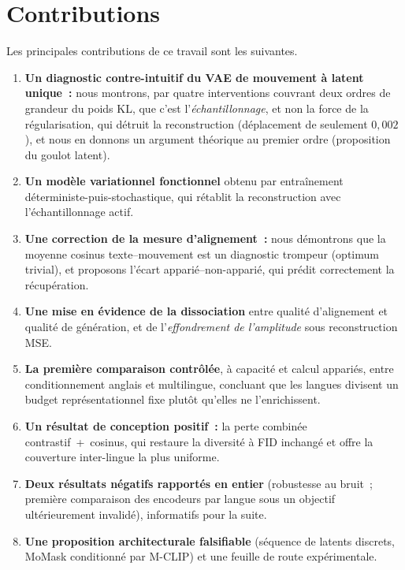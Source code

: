 \documentclass[12pt,a4paper,oneside]{report}
\theoremstyle{definition}
\theoremstyle{plain}
\begin{document}
\section*{Contributions}

Les principales contributions de ce travail sont les suivantes.

\begin{enumerate}[leftmargin=*]
\item \textbf{Un diagnostic contre-intuitif du VAE de mouvement à latent unique~:}
nous montrons, par quatre interventions couvrant deux ordres de grandeur du poids
KL, que c'est l'\emph{échantillonnage}, et non la force de la régularisation, qui
détruit la reconstruction (déplacement de seulement $0{,}002$), et nous en donnons
un argument théorique au premier ordre (proposition du goulot latent).
\item \textbf{Un modèle variationnel fonctionnel} obtenu par entraînement
déterministe-puis-stochastique, qui rétablit la reconstruction avec
l'échantillonnage actif.
\item \textbf{Une correction de la mesure d'alignement~:} nous démontrons que la
moyenne cosinus texte--mouvement est un diagnostic trompeur (optimum trivial), et
proposons l'écart apparié--non-apparié, qui prédit correctement la récupération.
\item \textbf{Une mise en évidence de la dissociation} entre qualité d'alignement et
qualité de génération, et de l'\emph{effondrement de l'amplitude} sous
reconstruction MSE.
\item \textbf{La première comparaison contrôlée}, à capacité et calcul appariés,
entre conditionnement anglais et multilingue, concluant que les langues divisent un
budget représentationnel fixe plutôt qu'elles ne l'enrichissent.
\item \textbf{Un résultat de conception positif~:} la perte combinée
contrastif~+~cosinus, qui restaure la diversité à FID inchangé et offre la couverture
inter-lingue la plus uniforme.
\item \textbf{Deux résultats négatifs rapportés en entier} (robustesse au bruit~;
première comparaison des encodeurs par langue sous un objectif ultérieurement
invalidé), informatifs pour la suite.
\item \textbf{Une proposition architecturale falsifiable} (séquence de latents
discrets, MoMask conditionné par M-CLIP) et une feuille de route expérimentale.
\end{enumerate}
\end{document}
